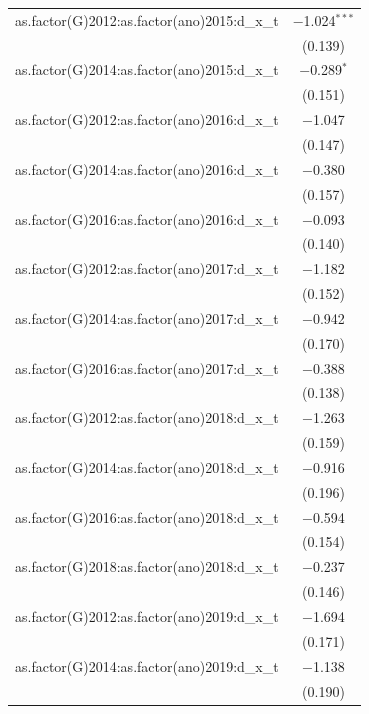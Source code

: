 \documentclass[portugues]{article}
\begin{document}
\begin{box_code}
   \begingroup
        \fontsize{8pt}{12pt}\selectfont
        \begin{center}
         \begin{tabular}{@{\extracolsep{5pt}}cc} 
            as.factor(G)2012:as.factor(ano)2015:d\_x\_t & $-$1.024$^{***}$ \\ 
          & (0.139) \\ 
         as.factor(G)2014:as.factor(ano)2015:d\_x\_t & $-$0.289$^{*}$ \\ 
          & (0.151) \\ 
         as.factor(G)2012:as.factor(ano)2016:d\_x\_t & $-$1.047 \\ 
          & (0.147) \\ 
         as.factor(G)2014:as.factor(ano)2016:d\_x\_t & $-$0.380 \\ 
          & (0.157) \\ 
         as.factor(G)2016:as.factor(ano)2016:d\_x\_t & $-$0.093 \\ 
          & (0.140) \\ 
         as.factor(G)2012:as.factor(ano)2017:d\_x\_t & $-$1.182 \\ 
          & (0.152) \\ 
         as.factor(G)2014:as.factor(ano)2017:d\_x\_t & $-$0.942 \\ 
          & (0.170) \\ 
         as.factor(G)2016:as.factor(ano)2017:d\_x\_t & $-$0.388 \\ 
          & (0.138) \\ 
         as.factor(G)2012:as.factor(ano)2018:d\_x\_t & $-$1.263 \\ 
          & (0.159) \\ 
         as.factor(G)2014:as.factor(ano)2018:d\_x\_t & $-$0.916 \\ 
          & (0.196) \\
         as.factor(G)2016:as.factor(ano)2018:d\_x\_t & $-$0.594 \\ 
          & (0.154) \\ 
         as.factor(G)2018:as.factor(ano)2018:d\_x\_t & $-$0.237 \\ 
          & (0.146) \\ 
         as.factor(G)2012:as.factor(ano)2019:d\_x\_t & $-$1.694 \\ 
          & (0.171) \\ 
         as.factor(G)2014:as.factor(ano)2019:d\_x\_t & $-$1.138 \\ 
          & (0.190) \\ 

\end{tabular}
\end{center}
\end{box_code}
\end{document}
